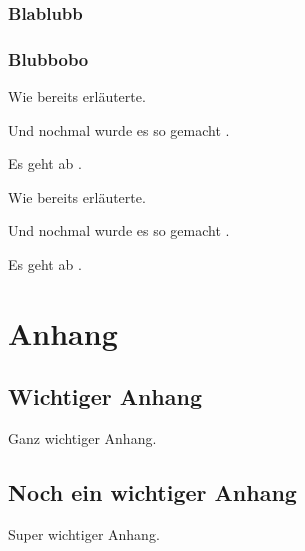 \documentclass{bht-thesis}
\newcounter{savepage}
\begin{document}
\subsection{Blablubb}
\blindtext[4]
\blindtext[2]
\blindtext[3]
\subsection{Blubbobo}
Wie \cite[S.~6]{ahu61} bereits erläuterte.

Und nochmal wurde es so gemacht \parencite[S.~15]{ahu61}.

Es geht ab \textcite[S.~121]{ahu61}.

Wie \cite[S.~6]{ahu61} bereits erläuterte.

Und nochmal wurde es so gemacht \parencite[S.~15]{ahu61}.

Es geht ab \textcite[S.~121]{ahu61}.

\cleardoublepage
\setcounter{page}{\thesavepage}

% 
\printbibliography

\cleardoublepage
\appendix
\chapter{Anhang}
\section{Wichtiger Anhang}
Ganz wichtiger Anhang.
\section{Noch ein wichtiger Anhang}
Super wichtiger Anhang.

\cleardoublepage
{}
\statutorydeclaration
\end{document}
